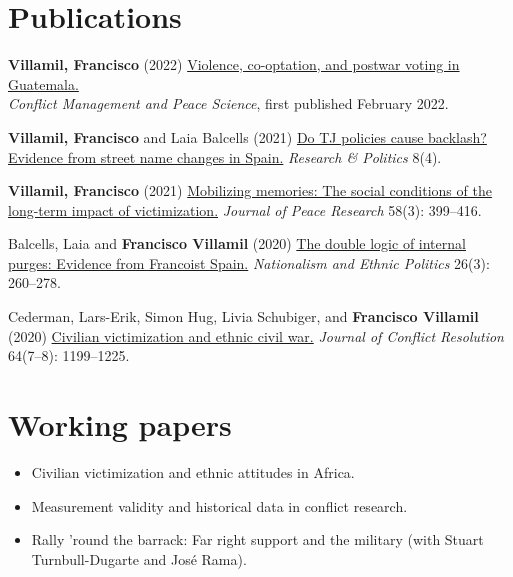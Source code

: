 \documentclass[a4paper, 12pt]{article}
\begin{document}
\section*{Publications}

\begin{etaremune}[leftmargin=12pt, itemsep=0pt]
\item \textbf{Villamil, Francisco} (2022) \href{https://journals.sagepub.com/doi/full/10.1177/07388942211066539}{Violence, co-optation, and postwar voting in Guatemala.}\\\textit{Conflict Management and Peace Science}, first published February 2022.
\item \textbf{Villamil, Francisco} and Laia Balcells (2021) \href{https://journals.sagepub.com/doi/full/10.1177/20531680211058550}{Do TJ policies cause backlash? Evidence from street name changes in Spain.} \textit{Research \& Politics} 8(4).
\item \textbf{Villamil, Francisco} (2021) \href{https://doi.org/10.1177/0022343320912816}{Mobilizing memories: The social conditions of the long-term impact of victimization.} \textit{Journal of Peace Research} 58(3): 399--416.
\item Balcells, Laia and \textbf{Francisco Villamil} (2020) \href{https://doi.org/10.1080/13537113.2020.1795451}{The double logic of internal purges: Evidence from Francoist Spain.} \textit{Nationalism and Ethnic Politics} 26(3): 260--278.
\item Cederman, Lars-Erik, Simon Hug, Livia Schubiger, and \textbf{Francisco Villamil} (2020) \href{https://doi.org/10.1177/0022002719898873}{Civilian victimization and ethnic civil war.} \textit{Journal of Conflict Resolution} 64(7--8): 1199--1225.
\end{etaremune}

\section*{Working papers}

\begin{itemize}[leftmargin=*, nolistsep]
\item Civilian victimization and ethnic attitudes in Africa.
\item Measurement validity and historical data in conflict research.
\item Rally 'round the barrack: Far right support and the military (with Stuart Turnbull-Dugarte and José Rama).
\end{itemize}
\end{document}
